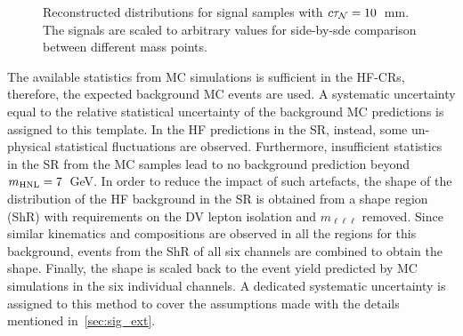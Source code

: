\begin{figure}[!ht]
    \centering
    \caption{Reconstructed \mhnl distributions for signal samples with $c\tau_\mathcal{N} = 10$~mm. The signals are scaled to arbitrary values for side-by-sde comparison between different mass points.}
    \label{fig:mhnl_signal}
\end{figure}

The available statistics from MC simulations is sufficient in the HF-CRs, therefore, the expected background MC events are used. A systematic uncertainty equal to the relative statistical uncertainty of the background MC predictions is assigned to this template. In the HF predictions in the SR, instead, some un-physical statistical fluctuations are observed. Furthermore, insufficient statistics in the SR from the MC samples lead to no background prediction beyond $m_{\mathrm{HNL}}=7$~GeV. In order to reduce the impact of such artefacts, the shape of the \mhnl distribution of the HF background in the SR is obtained from a shape region (ShR) with requirements on the DV lepton isolation and $m_{\ell\ell\ell}$ removed. Since similar kinematics and compositions are observed in all the regions for this background, events from the ShR of all six channels are combined to obtain the shape. Finally, the shape is scaled back to the event yield predicted by MC simulations in the six individual channels. A dedicated systematic uncertainty is assigned to this method to cover the assumptions made with the details mentioned in~\cref{sec:sig_ext}.
 

